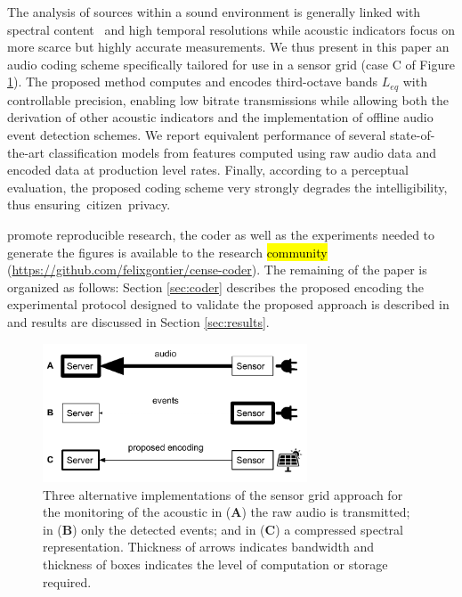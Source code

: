 \documentclass[sensors,article,accept,moreauthors,pdftex,10pt,a4paper]{mdpi}
\begin{document}
The analysis of sources within a sound environment is generally linked with spectral content~\cite{ishiyama2000} and high temporal resolutions while acoustic indicators focus on more scarce but highly accurate measurements. We thus present in this paper an audio coding scheme specifically tailored for use in a sensor grid (case C of Figure \ref{fig:codingScheme}). The proposed method computes and encodes third-octave bands $L_{eq}$ with controllable precision, enabling low bitrate transmissions while allowing both the derivation of other acoustic indicators and the implementation of offline audio event detection schemes. We report equivalent performance of several state-of-the-art classification models from features computed using raw audio data and encoded data at production level rates. Finally, according to a perceptual evaluation, the proposed coding scheme very strongly degrades the intelligibility, thus ensuring\mbox{ citizen privacy.}

 promote reproducible research, the coder as well as the experiments needed to generate the figures is available to the research \hl{community} ({\url{https://github.com/felixgontier/cense-coder}}). The remaining of the paper is organized as follows: Section \ref{sec:coder} describes the proposed encoding  the experimental protocol designed to validate the proposed approach is described in  and results are discussed in Section \ref{sec:results}.

\begin{figure}[H]
\centering
\includegraphics[width=0.7\textwidth]{figures/censeCoder}
\caption{Three alternative implementations of the sensor grid approach for the monitoring of the acoustic  in (\textbf{A}) the raw audio is transmitted; in (\textbf{B}) only the detected events; and in (\textbf{C}) a compressed spectral representation. Thickness of arrows indicates bandwidth and thickness of boxes indicates the level of computation or storage required.}
\label{fig:codingScheme}
\end{figure}
\end{document}
